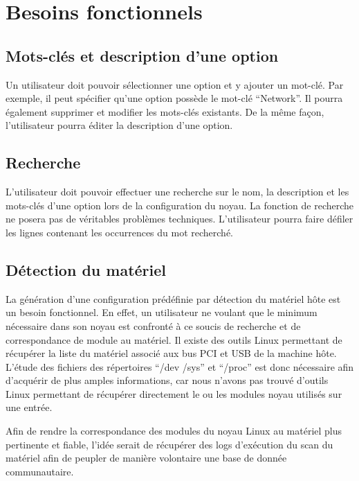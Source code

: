\documentclass[16pts]{report}
\begin{document}

\nocite{*}

\chapter{Besoins fonctionnels}
\label{cha:Besoins fonctionnels}


\section{Mots-clés et description d'une option}
\label{sec:Mots-clés et description d'une option}


Un utilisateur doit pouvoir sélectionner une option et y ajouter un mot-clé.
Par exemple, il peut spécifier qu’une option possède le mot-clé “Network”. Il
pourra également supprimer et modifier les mots-clés existants. De la même
façon, l’utilisateur pourra éditer la description d’une option.


\section{Recherche}
\label{sec:Recherche}

L’utilisateur doit pouvoir effectuer une recherche sur le nom, la description
et les mots-clés d'une option lors de la configuration du noyau. La fonction de
recherche ne posera pas de véritables problèmes techniques. L’utilisateur
pourra faire défiler les lignes contenant les occurrences du mot recherché.

\section{Détection du matériel}
\label{sec:Détection du matériel}

La génération d’une configuration prédéfinie par détection du matériel hôte est
un besoin fonctionnel. En effet, un utilisateur ne voulant que le minimum
nécessaire dans son noyau est confronté à ce soucis de recherche et de
correspondance de module au matériel.  Il existe des outils Linux permettant de
récupérer la liste du matériel associé aux bus PCI et USB de la machine hôte.
L’étude des fichiers des répertoires “/dev /sys” et “/proc” est donc nécessaire
afin d’acquérir de plus amples informations, car nous n’avons pas trouvé
d’outils Linux permettant de récupérer directement le ou les modules noyau
utilisés sur une entrée.

Afin de rendre la correspondance des modules du noyau Linux au matériel plus
pertinente et fiable, l’idée serait de récupérer des logs d’exécution du scan
du matériel afin de peupler de manière volontaire une base de donnée
communautaire.
\end{document}
